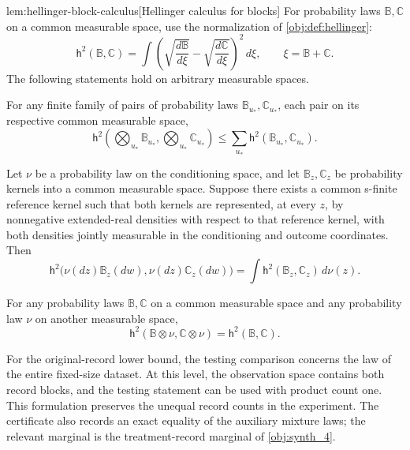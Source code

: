 \begin{lemmav}{lem:hellinger-block-calculus}[Hellinger calculus for blocks]
For probability laws \(\mathbb B,\mathbb C\) on a common measurable space, use the normalization of \cref{obj:def:hellinger}:
\[
\mathsf h^2(\mathbb B,\mathbb C)
=\int\left(\sqrt{\frac{d\mathbb B}{d\xi}}
           -\sqrt{\frac{d\mathbb C}{d\xi}}\right)^2\,d\xi,
\qquad \xi=\mathbb B+\mathbb C.
\]
The following statements hold on arbitrary measurable spaces.

For any finite family of pairs of probability laws \(\mathbb B_{u_*},\mathbb C_{u_*}\), each pair on its respective common measurable space,
\[
\mathsf h^2\left(\bigotimes_{u_*}\mathbb B_{u_*},
                \bigotimes_{u_*}\mathbb C_{u_*}\right)
\le \sum_{u_*}\mathsf h^2(\mathbb B_{u_*},\mathbb C_{u_*}).
\]

Let \(\nu\) be a probability law on the conditioning space, and let \(\mathbb B_z,\mathbb C_z\) be probability kernels into a common measurable space. Suppose there exists a common s-finite reference kernel such that both kernels are represented, at every \(z\), by nonnegative extended-real densities with respect to that reference kernel, with both densities jointly measurable in the conditioning and outcome coordinates. Then
\[
\mathsf h^2\bigl(\nu(dz)\mathbb B_z(dw),
                \nu(dz)\mathbb C_z(dw)\bigr)
=\int \mathsf h^2(\mathbb B_z,\mathbb C_z)\,d\nu(z).
\]

For any probability laws \(\mathbb B,\mathbb C\) on a common measurable space and any probability law \(\nu\) on another measurable space,
\[
\mathsf h^2(\mathbb B\otimes\nu,\mathbb C\otimes\nu)
=\mathsf h^2(\mathbb B,\mathbb C).
\]
\end{lemmav}

For the original-record lower bound, the testing comparison concerns the law of the entire fixed-size dataset. At this level, the observation space contains both record blocks, and the testing statement can be used with product count one. This formulation preserves the unequal record counts in the experiment. The certificate also records an exact equality of the auxiliary mixture laws; the relevant marginal is the treatment-record marginal of \cref{obj:synth_4}.

